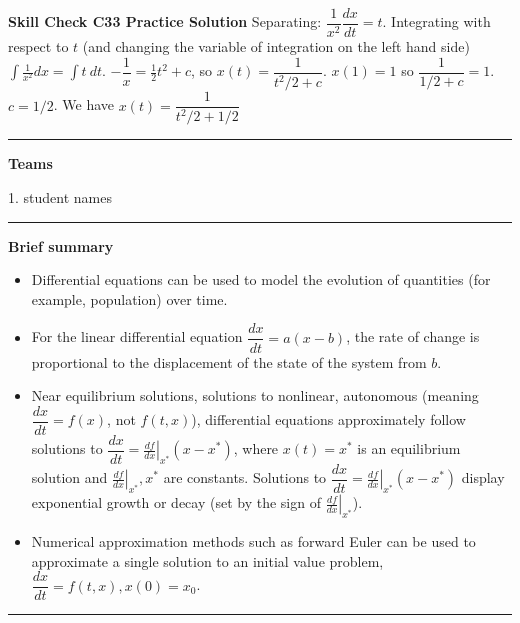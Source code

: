 \documentclass[12pt,letterpaper,noanswers]{exam}
\begin{document}
\noindent\textbf{Skill Check C33 Practice Solution}
Separating: $\dfrac{1}{x^2} \dfrac{dx}{dt} = t$.  Integrating with respect to $t$ (and changing the variable of integration on the left hand side) $\displaystyle\int \frac{1}{x^2} dx = \int t\ dt$.  $-\dfrac{1}{x} = \frac{1}{2}t^2 + c$, so $x(t) = \dfrac{1}{t^2/2 + c}$.  $x(1) = 1$ so $\dfrac{1}{1/2 + c} = 1$.  $c = 1/2$.  We have $x(t) = \dfrac{1}{t^2/2 + 1/2}$

\vspace{0.2cm}
\hrule
\vspace{0.2cm}

\noindent\textbf{Teams}
\begin{multicols}{2}

1.  student names
\end{multicols}

\vspace{0.2cm}
\hrule
\vspace{0.2cm}


\noindent\textbf{Brief summary}
\begin{tcolorbox}
\begin{itemize}
\itemsep0em
    \item Differential equations can be used to model the evolution of quantities (for example, population) over time.
    \item For the linear differential equation $\dfrac{dx}{dt} = a(x-b)$, 
     the rate of change is proportional to the displacement of the state of the system from $b$.
     \item Near equilibrium solutions, solutions to nonlinear, autonomous (meaning $\dfrac{dx}{dt} = f(x)$, not $f(t,x)$), differential equations approximately follow solutions to $\dfrac{dx}{dt} = \left.\frac{df}{dx}\right\vert_{x^*}(x-x^*)$, where $x(t) = x^*$ is an equilibrium solution and $\left.\frac{df}{dx}\right\vert_{x^*}, x^*$ are constants.  Solutions to $\dfrac{dx}{dt} = \left.\frac{df}{dx}\right\vert_{x^*}(x-x^*)$ display exponential growth or decay (set by the sign of $\left.\frac{df}{dx}\right\vert_{x^*}$).
    \item Numerical approximation methods such as forward Euler can be used to approximate a single solution to an initial value problem, $\dfrac{dx}{dt} = f(t,x), x(0) = x_0$.
\end{itemize}
\end{tcolorbox}

\vspace{0.2cm}
\hrule
\vspace{0.2cm}
\end{document}
